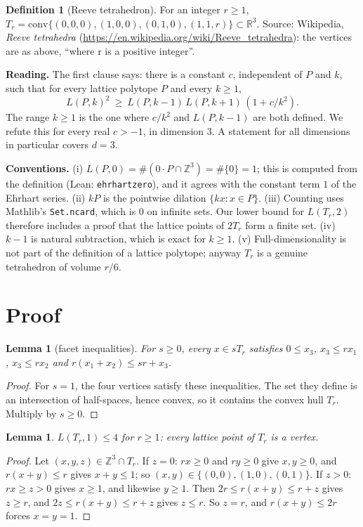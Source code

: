\documentclass[11pt]{article}
\renewcommand{\_}{\oldus\allowbreak}
\newtheorem{lemma}[theorem]{Lemma}
\theoremstyle{definition}
\newtheorem{definition}[theorem]{Definition}
\newcommand{\Z}{\mathbb{Z}}
\newcommand{\R}{\mathbb{R}}
\begin{document}
\begin{definition}[Reeve tetrahedron]
For an integer $r \ge 1$, $T_r = \mathrm{conv}\{(0,0,0), (1,0,0), (0,1,0), (1,1,r)\} \subset \R^3$.
Source: Wikipedia, \emph{Reeve tetrahedra} (\url{https://en.wikipedia.org/wiki/Reeve_tetrahedra}):
the vertices are as above, ``where r is a positive integer''.
\end{definition}

\textbf{Reading.} The first clause says: there is a constant $c$, independent of $P$ and $k$, such that
for every lattice polytope $P$ and every $k \ge 1$,
\[ L(P,k)^2 \ \ge\ L(P,k-1)\, L(P,k+1)\, (1 + c/k^2). \]
The range $k \ge 1$ is the one where $c/k^2$ and $L(P,k-1)$ are both defined. We refute this for every
real $c > -1$, in dimension $3$. A statement for all dimensions in particular covers $d = 3$.

\textbf{Conventions.} (i) $L(P,0) = \#(0 \cdot P \cap \Z^3) = \#\{0\} = 1$; this is computed from the
definition (Lean: \texttt{ehrhart\_zero}), and it agrees with the constant term $1$ of the Ehrhart
series. (ii) $kP$ is the pointwise dilation $\{k x : x \in P\}$. (iii) Counting uses Mathlib's
\texttt{Set.ncard}, which is $0$ on infinite sets. Our lower bound for $L(T_r,2)$ therefore includes a
proof that the lattice points of $2T_r$ form a finite set. (iv) $k - 1$ is natural subtraction, which is
exact for $k \ge 1$. (v) Full-dimensionality is not part of the definition of a lattice polytope;
anyway $T_r$ is a genuine tetrahedron of volume $r/6$.

\section{Proof}

\begin{lemma}[facet inequalities]\label{lem:facets}
For $s \ge 0$, every $x \in sT_r$ satisfies $0 \le x_3$, $x_3 \le r x_1$, $x_3 \le r x_2$ and $r(x_1 +
x_2) \le s r + x_3$.
\end{lemma}
\begin{proof}
For $s = 1$, the four vertices satisfy these inequalities. The set they define is an intersection of
half-spaces, hence convex, so it contains the convex hull $T_r$. Multiply by $s \ge 0$.
\end{proof}

\begin{lemma}\label{lem:L1}
$L(T_r, 1) \le 4$ for $r \ge 1$: every lattice point of $T_r$ is a vertex.
\end{lemma}
\begin{proof}
Let $(x,y,z) \in \Z^3 \cap T_r$. If $z = 0$: $r x \ge 0$ and $r y \ge 0$ give $x, y \ge 0$, and $r(x+y)
\le r$ gives $x + y \le 1$; so $(x,y) \in \{(0,0),(1,0),(0,1)\}$. If $z > 0$: $rx \ge z > 0$ gives $x \ge
1$, and likewise $y \ge 1$. Then $2r \le r(x+y) \le r + z$ gives $z \ge r$, and $2z \le r(x+y) \le r + z$
gives $z \le r$. So $z = r$, and $r(x+y) \le 2r$ forces $x = y = 1$.
\end{proof}
\end{document}
